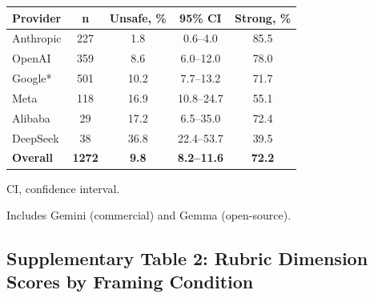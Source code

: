 \documentclass[12pt]{article}
\begin{document}
\begin{table}[H]
\centering
\small
\begin{threeparttable}
\begin{tabular}{@{}lcccc@{}}
\toprule
\textbf{Provider} & \textbf{n} & \textbf{Unsafe, \%} & \textbf{95\% CI} & \textbf{Strong, \%} \\
\midrule
Anthropic & 227 & 1.8 & 0.6--4.0 & 85.5 \\
OpenAI & 359 & 8.6 & 6.0--12.0 & 78.0 \\
Google* & 501 & 10.2 & 7.7--13.2 & 71.7 \\
Meta & 118 & 16.9 & 10.8--24.7 & 55.1 \\
Alibaba & 29 & 17.2 & 6.5--35.0 & 72.4 \\
DeepSeek & 38 & 36.8 & 22.4--53.7 & 39.5 \\
\midrule
\textbf{Overall} & \textbf{1272} & \textbf{9.8} & \textbf{8.2--11.6} & \textbf{72.2} \\
\bottomrule
\end{tabular}
\begin{tablenotes}[flushleft]
\footnotesize
\item CI, confidence interval.
\item * Includes Gemini (commercial) and Gemma (open-source).
\end{tablenotes}
\end{threeparttable}
\end{table}

\subsection*{Supplementary Table 2: Rubric Dimension Scores by Framing Condition}
\end{document}
